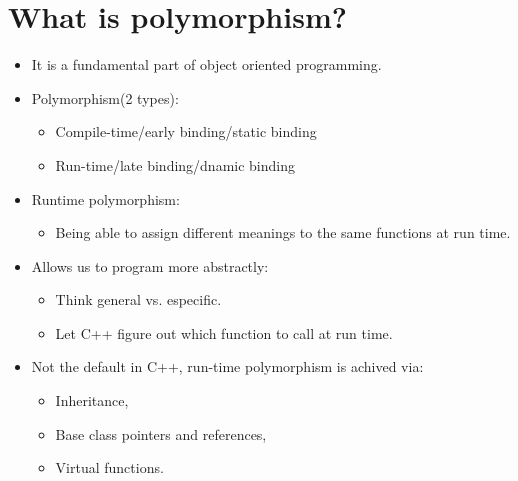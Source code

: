 \section{What is polymorphism?}
\begin{itemize}
    \item It is a fundamental part of object oriented programming.
    \item Polymorphism(2 types):
        \begin{itemize}
            \item Compile-time/early binding/static binding
            \item Run-time/late binding/dnamic binding
        \end{itemize}
    
    \item Runtime polymorphism:
        \begin{itemize}
            \item Being able to assign different meanings to the same functions at run time.
        \end{itemize}
    
    \item Allows us to program more abstractly:
        \begin{itemize}
            \item Think general vs. especific.
            \item Let C++ figure out which function to call at run time.
        \end{itemize}
    
    \item Not the default in C++, run-time polymorphism is achived via:
        \begin{itemize}
            \item Inheritance, 
            \item Base class pointers and references,
            \item Virtual functions.
        \end{itemize}
\end{itemize}

